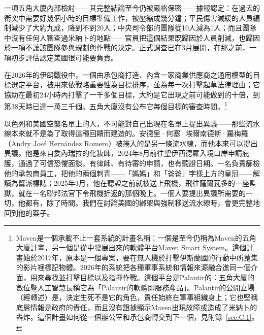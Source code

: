 一項五角大廈內部檢討——其完整結論至今仍被嚴格保密——據報認定：在過去的衝突中需要好幾個小時的目標準備工作，被壓縮成幾分鐘；平民傷害減緩的人員編制減少了大約九成，降到不到20人；中央司令部的團隊從10人減為1人；而且團隊中沒有任何人審查過米納卜的地點——官員把這個結果既歸因於人員削減，也歸因於一項不讓該團隊參與規劃與作戰的決定\autocite{Bloomberg2026KillChain}。正式調查已在3月展開，在那之前，一項初步評估認定美國很可能要負責\autocite{NPR2026MinabProbe}。

在2026年的伊朗戰役中，一個由承包商打造、內含一家商業供應商之通用模型的目標選定平台，被用來依戰略重要性為目標排序，並為每一次打擊起草法律理由\autocite{livingstone2026maven}；它協助在最初24小時內打擊了一千多個目標，大約是它出現之前可能做到的十倍\autocite{csis2026maven}，到第38天時已達一萬三千個\autocite{breakingdefense2026maven}。五角大廈沒有公布它每個目標的審查時間。\footnote{Maven是一個承載不止一套系統的計畫名稱：一個是至今仍稱為Maven的五角大廈計畫，另一個是從中發展出來的軟體平台Maven Smart System\autocite{csis2026maven}。這個計畫始於2017年，原本是一個專案，要在無人機於打擊伊斯蘭國的行動中所蒐集的影片裡標記物體\autocite{weisgerber2017maven,fang2019maven}。2026年的系統把各種軍事系統和情報來源融合進同一個介面，用來尋找並打擊目標以及指揮作戰\autocite{defensescoop2026transition}。這個平台是Palantir的：五角大廈的數位暨人工智慧長稱它為「Palantir的軟體即服務產品」\autocite{defensescoop2026transition}。Palantir的公開立場（經轉述）是，決定生死不是它的角色，責任始終在軍事組織身上\autocite{lee2026palantir}；它也堅稱底層情報是政府的責任，而且沒有證據顯示Maven出現故障或造成了米納卜的轟炸\autocite{Bloomberg2026KillChain}。這個計畫如何從一個辦公室和承包商轉交到下一個，見附錄~\ref{sec:C.1}。}

以色列和美國空襲名單上的人，不可能對自己出現在名單上提出異議——那些流水線本來就不是為了取得這種回饋而建造的。安德里·何塞·埃爾南德斯·羅梅羅（Andry José Hernández Romero）被捲入的是另一條流水線，而他本來可以提出異議。他是來自委內瑞拉的化妝師，2024年8月前往聖伊西德羅入境口岸申請庇護，通過了可信恐懼面談，有律師、有待審的申請，也有聽證日期\autocite{LULAC2025HernandezRomero,Vega2025HernandezRomero}。一名負責篩檢他的承包商員工，把他的兩個刺青——「媽媽」和「爸爸」字樣上方的皇冠——解讀為幫派標誌\autocite{Palomera2025Blade}；2025年3月，他在聽證之前就被送上飛機，飛往薩爾瓦多的一座監獄，就在一名聯邦法官下令飛機折返的那個晚上\autocite{jgg2025contempt}。一個人要提出異議所需要的一切，他都有，除了時間。我們在討論美國的綁架與強制移送流水線時，會更完整地回到他的案子。

